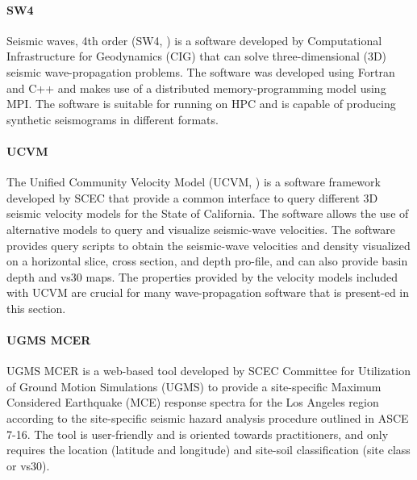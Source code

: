 \paragraph{SW4} Seismic waves, 4th order (SW4, \cite{petersson2017geodynamics}) is a software developed by Computational Infrastructure for Geodynamics (CIG) that can solve three-dimensional (3D) seismic wave-propagation problems. The software was developed using Fortran and C++ and makes use of a distributed memory-programming model using MPI. The software is suitable for running on HPC and is capable of producing synthetic seismograms in different formats.

\paragraph{UCVM} The Unified Community Velocity Model (UCVM, \cite{small2017scec}) is a software framework developed by SCEC that provide a common interface to query different 3D seismic velocity models for the State of California. The software allows the use of alternative models to query and visualize seismic-wave velocities. The software provides query scripts to obtain the seismic-wave velocities and density visualized on a horizontal slice, cross section, and depth pro-file, and can also provide basin depth and vs30 maps. The properties provided by the velocity models included with UCVM are crucial for many wave-propagation software that is present-ed in this section.

\paragraph{UGMS MCER} UGMS MCER \citep{crouse2018sitespecific} is a web-based tool developed by SCEC Committee for Utilization of Ground Motion Simulations (UGMS) to provide a site-specific Maximum Considered Earthquake (MCE) response spectra for the Los Angeles region according to the site-specific seismic hazard analysis procedure outlined in ASCE 7-16. The tool is user-friendly and is oriented towards practitioners, and only requires the location (latitude and longitude) and site-soil classification (site class or vs30).

